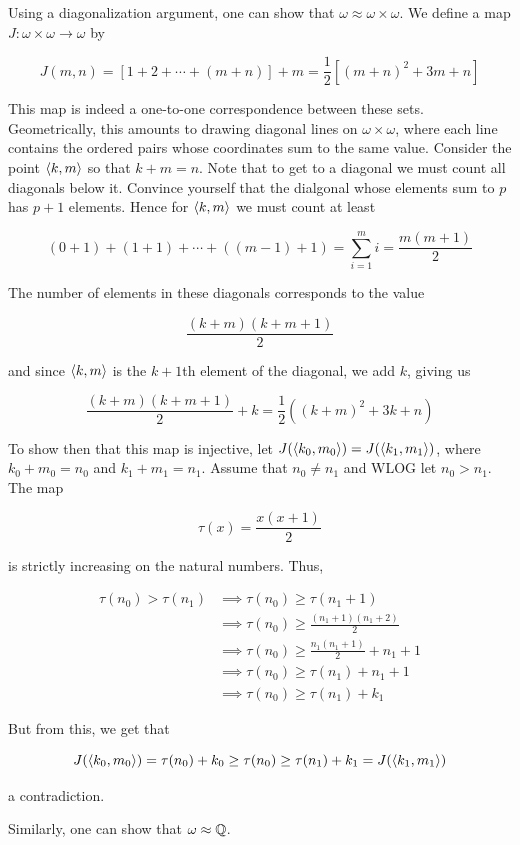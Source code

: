 \begin{example}
    Using a diagonalization argument, one can show that $\omega \approx \omega \times \omega$. We define a map $J: \omega \times \omega \to \omega$ by 
    
    \[J(m,n) = [1+2+\cdots +(m+n)] + m = \frac{1}{2}[(m+n)^2 + 3m + n]\]

    This map is indeed a one-to-one correspondence between these sets. Geometrically, this amounts to drawing diagonal lines on $\omega \times \omega$, where each line contains the ordered pairs whose coordinates sum to the same value. Consider the point $\left\langle k,m \right\rangle$ so that $k+m = n$. Note that to get to a diagonal we must count all diagonals below it. Convince yourself that the dialgonal whose elements sum to $p$ has $p+1$ elements. Hence for $\left\langle k,m \right\rangle$ we must count at least 

    \[(0+1) + (1 + 1) + \cdots + ((m-1) + 1) = \sum_{i=1}^m i = \frac{m(m+1)}{2}\]

    The number of elements in these diagonals corresponds to the value

    \[\frac{(k+m)(k+m+1)}{2}\]

    and since $\left\langle k,m \right\rangle$ is the $k+1$th element of the diagonal, we add $k$, giving us 

    \[\frac{(k+m)(k+m+1)}{2} + k = \frac{1}{2}((k+m)^2 + 3k + n)\]

    To show then that this map is injective, let $J(\left\langle k_0,m_0 \right\rangle) = J(\left\langle k_1,m_1 \right\rangle)$, where $k_0 + m_0 = n_0$ and $k_1 + m _1 = n_1$. Assume that $n_0 \neq n_1$ and WLOG let $n_0 > n_1$. The map 

    \[\tau(x) = \frac{x(x+1)}{2}\]

    is strictly increasing on the natural numbers. Thus,

    \begin{align*}
        \tau(n_0) > \tau(n_1) & \implies \tau(n_0) \geq \tau(n_1 + 1) \\
        & \implies \tau(n_0) \geq \frac{(n_1+1)(n_1 + 2)}{2} \\
        & \implies \tau(n_0) \geq \frac{n_1(n_1+1)}{2} + n_1 + 1 \\
        & \implies \tau(n_0) \geq \tau(n_1) + n_1 + 1 \\
        & \implies \tau(n_0) \geq \tau(n_1) + k_1
    \end{align*}

    But from this, we get that 

    \[J(\left\langle k_0,m_0 \right\rangle) = \tau(n_0) + k_0 \geq \tau(n_0) \geq \tau(n_1) + k_1 = J(\left\langle k_1,m_1 \right\rangle)\]

    a contradiction. 
    
    Similarly, one can show that $\omega \approx \mathbb{Q}$. 
\end{example}

